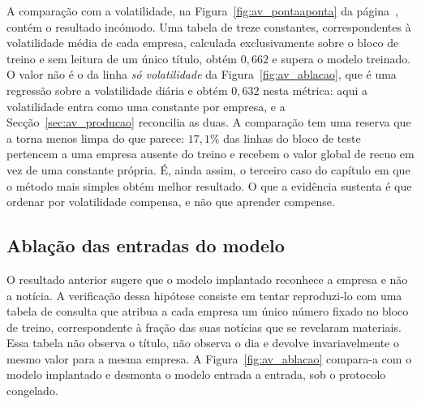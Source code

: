 A comparação com a volatilidade, na Figura~\ref{fig:av_pontaaponta} da
página~\pageref{fig:av_pontaaponta}, contém o resultado incómodo. Uma tabela de treze constantes,
correspondentes à volatilidade média de cada empresa, calculada exclusivamente sobre o bloco de
treino e sem leitura de um único título, obtém $0{,}662$ e supera o modelo treinado. O valor não é
o da linha \emph{só volatilidade} da Figura~\ref{fig:av_ablacao}, que é uma regressão sobre a
volatilidade diária e obtém $0{,}632$ nesta métrica: aqui a volatilidade entra como uma constante
por empresa, e a Secção~\ref{sec:av_producao} reconcilia as duas. A comparação
tem uma reserva que a torna menos limpa do que parece: $17{,}1\%$ das linhas do bloco de teste
pertencem a uma empresa ausente do treino e recebem o valor global de recuo em vez de uma
constante própria. É, ainda assim, o terceiro caso do capítulo em que o método mais simples obtém melhor
resultado. O que a evidência sustenta é
que ordenar por volatilidade compensa, e não que aprender compense.

\subsection{Ablação das entradas do modelo}
\label{sec:av_ablacao}

O resultado anterior sugere que o modelo implantado reconhece a empresa e não a notícia. A
verificação dessa hipótese consiste em tentar reproduzi-lo com uma tabela de consulta que atribua a
cada empresa um único número fixado no bloco de treino, correspondente à fração das suas notícias que
se revelaram materiais. Essa tabela não observa o título, não observa o dia e devolve invariavelmente
o mesmo valor para a mesma empresa. A Figura~\ref{fig:av_ablacao} compara-a com o modelo implantado e
desmonta o modelo entrada a entrada, sob o protocolo congelado.

